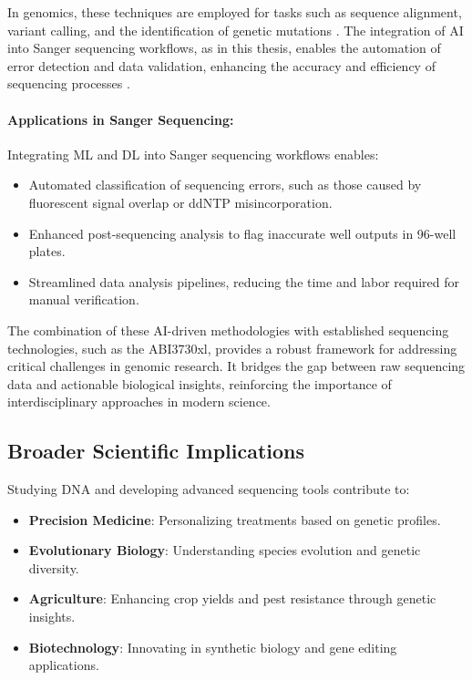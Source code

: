 In genomics, these techniques are employed for tasks such as sequence alignment, variant calling, and the identification of genetic mutations \cite{ml_dna_applications}. The integration of AI into Sanger sequencing workflows, as in this thesis, enables the automation of error detection and data validation, enhancing the accuracy and efficiency of sequencing processes \cite{ai_sanger_sequencing,esteva_ai_genomics}.

\paragraph{Applications in Sanger Sequencing:}
Integrating ML and DL into Sanger sequencing workflows enables:
\begin{itemize}
\item Automated classification of sequencing errors, such as those caused by fluorescent signal overlap or ddNTP misincorporation.
\item Enhanced post-sequencing analysis to flag inaccurate well outputs in 96-well plates.
\item Streamlined data analysis pipelines, reducing the time and labor required for manual verification.
\end{itemize}

The combination of these AI-driven methodologies with established sequencing technologies, such as the ABI3730xl, provides a robust framework for addressing critical challenges in genomic research. It bridges the gap between raw sequencing data and actionable biological insights, reinforcing the importance of interdisciplinary approaches in modern science.
  
\subsection{Broader Scientific Implications}
Studying DNA and developing advanced sequencing tools contribute to:
\begin{itemize}
\item \textbf{Precision Medicine}: Personalizing treatments based on genetic profiles.
\item \textbf{Evolutionary Biology}: Understanding species evolution and genetic diversity.
\item \textbf{Agriculture}: Enhancing crop yields and pest resistance through genetic insights.
\item \textbf{Biotechnology}: Innovating in synthetic biology and gene editing applications.
\end{itemize}


